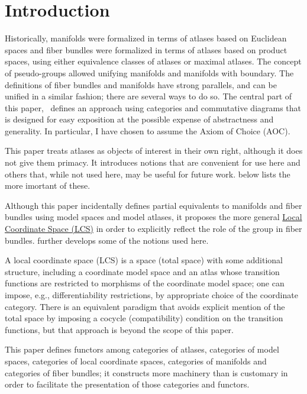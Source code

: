 \documentclass{article}
\begin{document}
\part {Introduction}
\label{part:intro}

Historically, manifolds were formalized in terms of atlases based on
Euclidean spaces and fiber bundles were formalized in terms of atlases
based on product spaces, using either equivalence classes of atlases or
maximal atlases.  The concept of pseudo-groups allowed unifying
manifolds and manifolds with boundary.  The definitions of fiber bundles
and manifolds have strong parallels, and can be unified in a similar
fashion; there are several ways to do so. The central part of this
paper, \, defines an approach using categories and
commutative diagrams that is designed for easy exposition at the
possible expense of abstractness and generality. In particular, I have
chosen to assume the Axiom of Choice (AOC).

This paper treats atlases as objects of interest in their own right,
although it does not give them primacy. It introduces notions that are
convenient for use here and others that, while not used here, may be
useful for future work.  below lists the more imortant of
these.

Although this paper incidentally defines partial equivalents to
manifolds and fiber bundles using model spaces and model atlases, it
proposes the more general
\hyperref[def:LCS]{Local Coordinate Space (LCS)} in order to explicitly
reflect the role of the group in fiber bundles. \cite{Taxonomy} further
develops some of the notions used here.

A local coordinate space (LCS) is a space (total space) with some
additional structure, including a coordinate model space and an atlas
whose transition functions are restricted to morphisms of the coordinate
model space; one can impose, e.g., differentiability restrictions, by
appropriate choice of the coordinate category. There is an equivalent
paradigm that avoids explicit mention of the total space by imposing a
cocycle (compatibility) condition on the transition functions, but that
approach is beyond the scope of this paper.

This paper defines functors among categories of atlases, categories of
model spaces, categories of local coordinate spaces, categories of
manifolds and categories of fiber bundles; it constructs more machinery
than is customary in order to facilitate the presentation of those
categories and functors.
\end{document}
